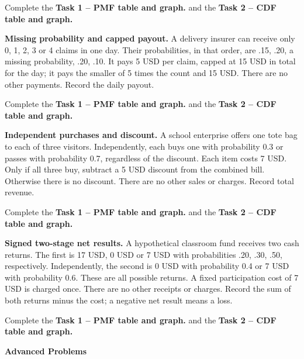 Complete the \textbf{Task 1 -- PMF table and graph.} and the \textbf{Task 2 -- CDF table and graph.}

\textbf{Missing probability and capped payout.} A delivery insurer can receive only 0, 1, 2, 3 or 4 claims in
one day. Their probabilities, in that order, are .15, .20, a missing probability, .20, .10. It pays 5 USD per
claim, capped at 15 USD in total for the day; it pays the smaller of 5 times the count and 15 USD. There are
no other payments. Record the daily payout.

Complete the \textbf{Task 1 -- PMF table and graph.} and the \textbf{Task 2 -- CDF table and graph.}

\textbf{Independent purchases and discount.} A school enterprise offers one tote bag to each of three
visitors. Independently, each buys one with probability 0.3 or passes with probability 0.7, regardless of the
discount. Each item costs 7 USD. Only if all three buy, subtract a 5 USD discount from the combined bill.
Otherwise there is no discount. There are no other sales or charges. Record total revenue.

Complete the \textbf{Task 1 -- PMF table and graph.} and the \textbf{Task 2 -- CDF table and graph.}

\textbf{Signed two-stage net results.} A hypothetical classroom fund receives two cash returns. The first is
17 USD, 0 USD or 7 USD with probabilities .20, .30, .50, respectively. Independently, the second is 0 USD with
probability 0.4 or 7 USD with probability 0.6. These are all possible returns. A fixed participation cost of 7
USD is charged once. There are no other receipts or charges. Record the sum of both returns minus the cost; a
negative net result means a loss.

Complete the \textbf{Task 1 -- PMF table and graph.} and the \textbf{Task 2 -- CDF table and graph.}

\clearpage
\begingroup
\small
\setlength{\parskip}{3pt}
\setlength{\tabcolsep}{3pt}
\setlength{\extrarowheight}{0pt}
\renewcommand{\arraystretch}{1}
{\centering\large\bfseries Advanced Problems\par}

